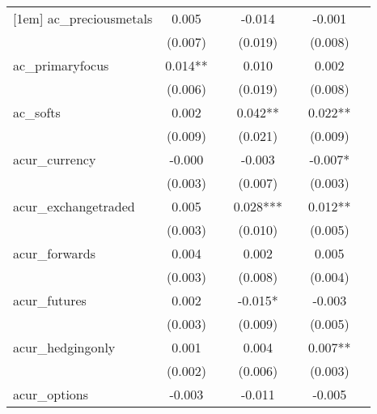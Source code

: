 {\begin{tabular}{l*{6}{c}}
[1em]
ac\_preciousmetals&       0.005   &               &      -0.014   &               &      -0.001   &               \\
            &     (0.007)   &               &     (0.019)   &               &     (0.008)   &               \\
[1em]
ac\_primaryfocus&       0.014** &               &       0.010   &               &       0.002   &               \\
            &     (0.006)   &               &     (0.019)   &               &     (0.008)   &               \\
[1em]
ac\_softs    &       0.002   &               &       0.042** &               &       0.022** &               \\
            &     (0.009)   &               &     (0.021)   &               &     (0.009)   &               \\
[1em]
acur\_currency&      -0.000   &               &      -0.003   &               &      -0.007*  &               \\
            &     (0.003)   &               &     (0.007)   &               &     (0.003)   &               \\
[1em]
acur\_exchangetraded&       0.005   &               &       0.028***&               &       0.012** &               \\
            &     (0.003)   &               &     (0.010)   &               &     (0.005)   &               \\
[1em]
acur\_forwards&       0.004   &               &       0.002   &               &       0.005   &               \\
            &     (0.003)   &               &     (0.008)   &               &     (0.004)   &               \\
[1em]
acur\_futures&       0.002   &               &      -0.015*  &               &      -0.003   &               \\
            &     (0.003)   &               &     (0.009)   &               &     (0.005)   &               \\
[1em]
acur\_hedgingonly&       0.001   &               &       0.004   &               &       0.007** &               \\
            &     (0.002)   &               &     (0.006)   &               &     (0.003)   &               \\
[1em]
acur\_options&      -0.003   &               &      -0.011   &               &      -0.005   &               \\

\end{tabular}}
